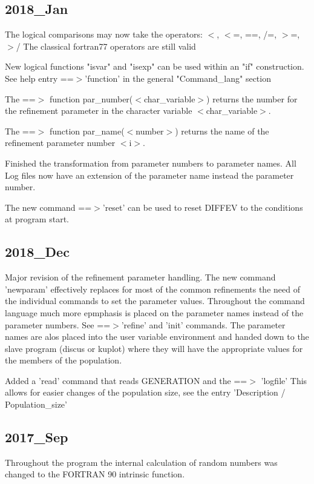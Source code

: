 \subsection*{2018\_Jan}
\par
The logical comparisons may now take the operators: 
$ <$, $ <$=, ==, /=, $> $=, $> $/ 
The classical fortran77 operators are still valid 
\par
New logical functions "isvar" and "isexp" can be used within an 
"if" construction. See help entry ==$> $'function' in the 
general "Command\_lang" section 
\par
The ==$> $ function par\_number($ <$char\_variable$> $) returns the 
number for the refinement parameter in the character variable 
$ <$char\_variable$> $. 
\par
The ==$> $ function par\_name($ <$number$> $) returns the name of the 
refinement parameter number $ <$i$> $. 
\par
Finished the transformation from parameter numbers to 
parameter names. All Log files now have an extension of the 
parameter name instead the parameter number. 
\par
The new command ==$> $'reset' can be used to reset DIFFEV to the 
conditions at program start. 
\subsection*{2018\_Dec}
\par
Major revision of the refinement parameter handling. 
The new command 'newparam' effectively replaces for most of the 
common refinements the need of the individual commands to set the 
parameter values. Throughout the command language much more 
epmphasis is placed on the parameter names instead of the 
parameter numbers. See ==$> $'refine' and 'init' commands. 
The parameter names are alos placed into the user variable 
environment and handed down to the slave program (discus or kuplot) 
where they will have the appropriate values for the members of 
the population. 
\par
Added a 'read' command that reads GENERATION and the ==$> $ 'logfile' 
This allows for easier changes of the population size, see the 
entry 'Description / Population\_size' 
\subsection*{2017\_Sep}
\par
Throughout the program the internal calculation of random numbers 
was changed to the FORTRAN 90 intrinsic function. 

